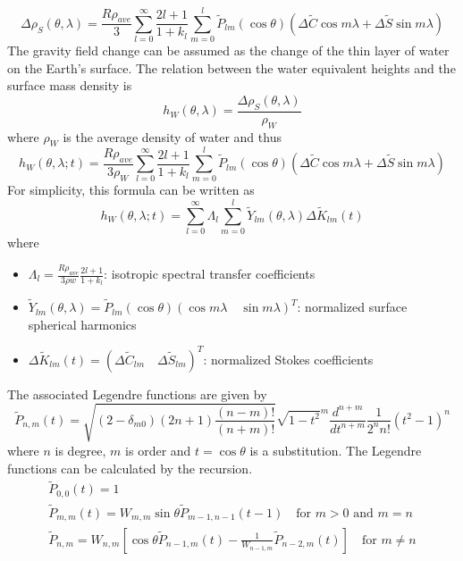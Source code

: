 \begin{equation}
	\Delta \rho_{S}(\theta,\lambda) = \frac{R \rho_{ave}}{3} \sum_{l=0}^{\infty} \frac{2l+1}{1+k_{l}} \sum_{m=0}^{l} \tilde{P}_{lm} (\cos \theta) (\Delta \tilde{C} \cos m \lambda + \Delta \tilde{S} \sin m \lambda)
\end{equation}
The gravity field change can be assumed as the change of the thin layer of water on the Earth's surface. The relation between the water equivalent heights and the surface mass density is
\begin{equation}
	h_{W}(\theta,\lambda) = \frac{\Delta \rho_{S}(\theta,\lambda)}{\rho_{W}}
\end{equation}
where $\rho_{W}$ is the average density of water and thus
\begin{equation}
	h_{W}(\theta,\lambda;t) = \frac{R \rho_{ave}}{3\rho_{W}} \sum_{l=0}^{\infty} \frac{2l+1}{1+k_{l}} \sum_{m=0}^{l} \tilde{P}_{lm} (\cos \theta) (\Delta \tilde{C} \cos m \lambda + \Delta \tilde{S} \sin m \lambda)
\end{equation}
For simplicity, this formula can be written as 
\begin{equation}
	h_{W}(\theta,\lambda;t) = \sum_{l=0}^{\infty} \Lambda_{l} \sum_{m=0}^{l} \tilde{Y}_{lm}(\theta,\lambda) \Delta \tilde{K}_{lm}(t)
\end{equation}
where 
\begin{itemize}
	\item $\Lambda_{l} = \frac{R \rho_{ave}}{3 \rho w} \frac{2l+1}{1+k_{l}}$: isotropic spectral transfer coefficients
	\item $\tilde{Y}_{lm}(\theta,\lambda) = \tilde{P}_{lm}(\cos \theta)(\cos m\lambda \quad \sin m \lambda)^{T}$: normalized surface spherical harmonics
	\item $ \Delta \tilde{K}_{lm}(t) = (\Delta \tilde{C}_{lm} \quad \Delta \tilde{S}_{lm})^{T}$: normalized Stokes coefficients
\end{itemize}
The associated Legendre functions are given by
\begin{equation}
	\tilde{P}_{n,m}(t) = \sqrt{(2-\delta_{m0})(2n+1)\frac{(n-m)!}{(n+m)!}}\sqrt{1-t^2}^{m}\frac{d^{n+m}}{dt^{n+m}}\frac{1}{2^n n!}(t^2 - 1)^n
\end{equation}
where $n$ is degree, $m$ is order and $t= \cos \theta$ is a substitution. The Legendre functions can be calculated by the recursion.
\begin{gather}
	\tilde{P}_{0,0}(t) = 1 \\
	\tilde{P}_{m,m}(t) = W_{m,m}\sin \theta \tilde{P}_{m-1,n-1}(t-1) \quad  \text{for $m > 0$ and $m =n$} \\
	\tilde{P}_{n,m} = W_{n,m}[\cos \theta \tilde{P}_{n-1,m}(t) - \frac{1}{W_{n-1,m}} \tilde{P}_{n-2,m}(t)] \quad \text{for $m \neq n$}
\end{gather}       
